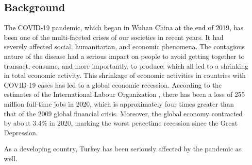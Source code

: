 \documentclass[a4paper,12pt]{article}
\begin{document}
\subsection{Background}
    The COVID-19 pandemic, which began in Wuhan China at the end of 2019, has been one of the multi-faceted crises of our societies in recent years. It had severely affected social, humanitarian, and economic phenomena. The contagious nature of the disease had a serious impact on people to avoid getting together to transact, consume, and more importantly, to produce; which all led to a shrinking in total economic activity. This shrinkage of economic activities in countries with COVID-19 cases has led to a global economic recession. According to the estimates of the International Labour Organization \cite{ilo2021}, there has been a loss of 255 million full-time jobs in 2020, which is approximately four times greater than that of the 2009 global financial crisis. Moreover, the global economy contracted by about 3.4\% in 2020, marking the worst peacetime recession since the Great Depression.

    \indent As a developing country, Turkey has been seriously affected by the pandemic as well. 
    
\end{document}
